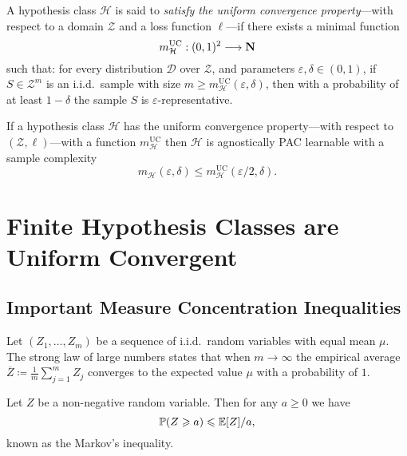 \begin{definition}
\label{def:learner-uniform-convergence-property}
A hypothesis class \(\mathcal{H}\) is said to \emph{satisfy the uniform convergence
property}---with respect to a domain \(\mathcal{Z}\) and a loss function
\(\ell\)---if there exists a minimal function
\[
m_{\mathcal{H}}^{\text{UC}}: (0, 1)^2 \longrightarrow \mathbf{N}
\]
such that: for every distribution \(\mathcal{D}\) over \(\mathcal{Z}\), and
parameters \(\varepsilon, \delta \in (0, 1)\), if \(S \in \mathcal{Z}^m\) is an
i.i.d.~sample with size
\(m \geq m_{\mathcal{H}}^{\text{UC}}(\varepsilon, \delta)\), then with a
probability of at least \(1 - \delta\) the sample \(S\) is
\(\varepsilon\)-representative.
\end{definition}

\begin{corollary}
\label{cor:unif-conv-hypothesis-is-agnostically-pac-learnable}
If a hypothesis class \(\mathcal{H}\) has the uniform convergence property---with
respect to \((\mathcal{Z}, \ell)\)---with a function
\(m_{\mathcal{H}}^{\text{UC}}\) then \(\mathcal{H}\) is agnostically PAC
learnable with a sample complexity
\[
m_{\mathcal{H}}(\varepsilon, \delta) \leq
m_{\mathcal{H}}^{\text{UC}}(\varepsilon/2, \delta).
\]
\end{corollary}

\section{Finite Hypothesis Classes are Uniform Convergent}

\subsection{Important Measure Concentration Inequalities}

\begin{proposition}
\label{prop:strong-law-of-large-numbers}
Let \((Z_1, \dots, Z_m)\) be a sequence of i.i.d.~random variables with equal
mean \(\mu\). The strong law of large numbers states that when \(m \to \infty\)
the empirical average \(\overline Z \coloneq \frac{1}{m} \sum_{j=1}^m Z_j\)
converges to the expected value \(\mu\) with a probability of \(1\).
\end{proposition}

\begin{lemma}
\label{lem:markov-inequality}
Let \(Z\) be a non-negative random variable. Then for any \(a \geq 0\) we have
\[
\operatorname{\mathbb{P}}(Z \geqslant a) \leqslant \operatorname{\mathbb{E}}[Z] / a,
\]
known as the Markov's inequality.
\end{lemma}

